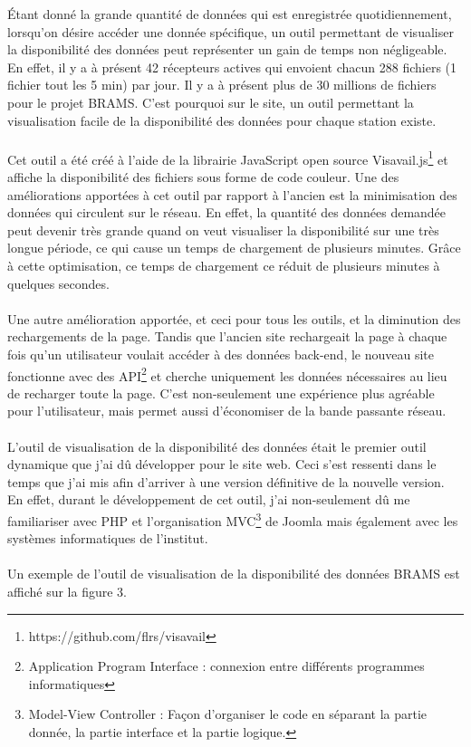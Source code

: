 \documentclass[11pt]{article}
\begin{document}
Étant donné la grande quantité de données qui est enregistrée quotidiennement, lorsqu'on désire accéder une donnée spécifique, un outil permettant de visualiser la disponibilité des données peut représenter un gain de temps non négligeable.
En effet, il y a à présent 42 récepteurs actives qui envoient chacun 288 fichiers (1 fichier tout les 5 min) par jour.
Il y a à présent plus de 30 millions de fichiers pour le projet BRAMS.
C'est pourquoi sur le site, un outil permettant la visualisation facile de la disponibilité des données pour chaque station existe.\\
\\
Cet outil a été créé à l'aide de la librairie JavaScript open source Visavail.js\footnote{https://github.com/flrs/visavail} et affiche la disponibilité des fichiers sous forme de code couleur.
Une des améliorations apportées à cet outil par rapport à l'ancien est la minimisation des données qui circulent sur le réseau.
En effet, la quantité des données demandée peut devenir très grande quand on veut visualiser la disponibilité sur une très longue période, ce qui cause un temps de chargement de plusieurs minutes.
Grâce à cette optimisation, ce temps de chargement ce réduit de plusieurs minutes à quelques secondes.\\
\\
Une autre amélioration apportée, et ceci pour tous les outils, et la diminution des rechargements de la page.
Tandis que l'ancien site rechargeait la page à chaque fois qu'un utilisateur voulait accéder à des données back-end, le nouveau site fonctionne avec des API\footnote{Application Program Interface : connexion entre différents programmes informatiques} et cherche uniquement les données nécessaires au lieu de recharger toute la page.
C'est non-seulement une expérience plus agréable pour l'utilisateur, mais permet aussi d'économiser de la bande passante réseau.\\
\\
L'outil de visualisation de la disponibilité des données était le premier outil dynamique que j'ai dû développer pour le site web.
Ceci s'est ressenti dans le temps que j'ai mis afin d'arriver à une version définitive de la nouvelle version.
En effet, durant le développement de cet outil, j'ai non-seulement dû me familiariser avec PHP et l'organisation MVC\footnote{Model-View Controller : Façon d'organiser le code en séparant la partie donnée, la partie interface et la partie logique.} de Joomla mais également avec les systèmes informatiques de l'institut.\\
\\
Un exemple de l'outil de visualisation de la disponibilité des données BRAMS est affiché sur la figure 3.
\end{document}
